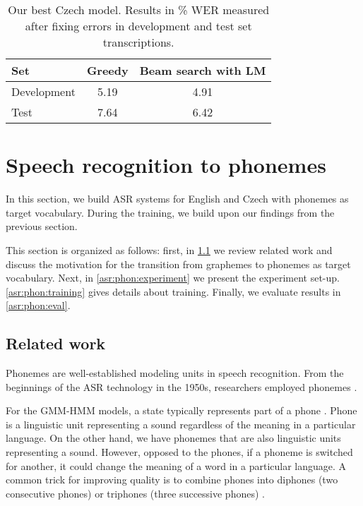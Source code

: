 \begin{table}[t]
	\centering
	\begin{tabular}{lcc}
		\bf Set & \bf Greedy & \bf Beam search with LM \\
		\hline
		Development & 5.19 & 4.91 \\
		Test & 7.64 & 6.42 \\
	\end{tabular}
	\caption{Our best Czech model. Results in \% WER measured after fixing errors in development and test set transcriptions.}
	\label{tab:results_rerun}
\end{table}

\pagebreak


\section{Speech recognition to phonemes}
\label{asr:transfer_phonemes}
In this section, we build ASR systems for English and Czech with phonemes as target vocabulary. During the training, we build upon our findings from the previous section.

This section is organized as follows: first, in \cref{asr:phon:related} we review related work and discuss the motivation for the transition from graphemes to phonemes as target vocabulary. Next, in \cref{asr:phon:experiment} we present the experiment set-up. \cref{asr:phon:training} gives details about training. Finally, we evaluate results in \cref{asr:phon:eval}.

\subsection{Related work}
\label{asr:phon:related}

Phonemes are well-established modeling units in speech recognition. From the beginnings of the ASR technology in the 1950s, researchers employed phonemes . 

For the GMM-HMM models, a state typically represents part of a phone . Phone is a linguistic unit representing a sound regardless of the meaning in a particular language. On the other hand, we have phonemes that are also linguistic units representing a sound. However, opposed to the phones, if a phoneme is switched for another, it could change the meaning of a word in a particular language. A common trick for improving quality is to combine phones into diphones (two consecutive phones) or triphones (three successive phones) .  

